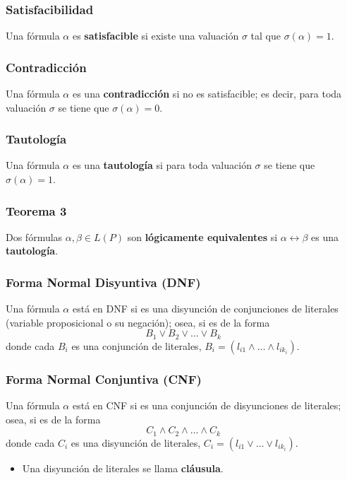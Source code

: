 \begin{multicols}{2}
    \subsubsection*{Satisfacibilidad}
    Una fórmula $\alpha$ es \textbf{satisfacible} si existe una valuación $\sigma$ tal que $\sigma(\alpha) = 1$.
    
    \subsubsection*{Contradicción}
    Una fórmula $\alpha$ es una \textbf{contradicción} si no es satisfacible; es decir, para toda valuación $\sigma$ se tiene que $\sigma(\alpha) = 0$.
    
    \subsubsection*{Tautología}
    Una fórmula $\alpha$ es una \textbf{tautología} si para toda valuación $\sigma$ se tiene que $\sigma(\alpha) = 1$.
    
    \subsubsection*{Teorema 3}
    Dos fórmulas $\alpha, \beta \in L(P)$ son \textbf{lógicamente equivalentes} si $\alpha \leftrightarrow \beta$ es una \textbf{tautología}.
    
    \subsubsection*{Forma Normal Disyuntiva (DNF)}
    Una fórmula $\alpha$ está en DNF si es una disyunción de conjunciones de literales (variable proposicional o su negación); osea, si es de la forma
    $$
        B_1 \vee B_2 \vee \ldots \vee B_k
    $$
    donde cada $B_i$ es una conjunción de literales, $B_i = (l_{i1} \wedge \ldots \wedge l_{ik_i})$.
    
    \subsubsection*{Forma Normal Conjuntiva (CNF)}
    Una fórmula $\alpha$ está en CNF si es una conjunción de disyunciones de literales; osea, si es de la forma
    $$
        C_1 \wedge C_2 \wedge \ldots \wedge C_k
    $$
    donde cada $C_i$ es una disyunción de literales, $C_i = (l_{i1} \vee \ldots \vee l_{ik_i})$.
    
    \begin{itemize}
        \item Una disyunción de literales se llama \textbf{cláusula}.
    \end{itemize}
    

\end{multicols}
